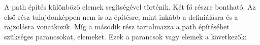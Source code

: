 \documentclass[12pt]{report}
\theoremstyle{definition}
\begin{document}


A path építés
különböző elemek segítségével történik. Két fő részre bontható. Az első rész
tulajdonképpen nem is az építésre, mint inkább a definiálásra és a rajzolásra
vonatkozik. Míg a második rész tartalmazza a path építéséhet szükséges
parancsokat, elemeket. Ezek a parancsok vagy elemek a következők:
\end{document}
